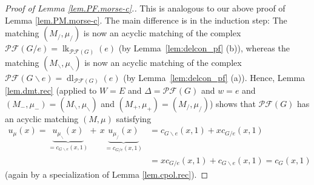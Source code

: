 \documentclass[12pt]{amsart}
\theoremstyle{definition}
\DeclareMathOperator{\lk}{lk}
\DeclareMathOperator{\dl}{dl}
\newcommand{\Pf}[1]{\mathcal{PF}\left(#1\right)}
\begin{document}
\begin{proof}
[Proof of Lemma \ref{lem.PF.morse-c}.]This is analogous to our above proof of
Lemma \ref{lem.PM.morse-c}. The main difference is in the induction step: The
matching $\left(  M_{/},\mu_{/}\right)  $ is now an acyclic matching of the
complex
$\Pf{G/e}  =\lk_{\Pf{G}}\left(  e\right)  $
(by Lemma~\ref{lem:delcon_pf}
(b)), whereas the matching $\left(  M_{\backslash},\mu_{\backslash}\right)  $
is now an acyclic matching of the complex $\Pf{G\backslash e}
=\dl_{\Pf{G}}\left(  e\right)  $
(by Lemma~\ref{lem:delcon_pf} (a)). Hence, Lemma \ref{lem.dmt.rec} (applied to
$W=E$ and $\Delta=\Pf{G}$ and $w=e$ and $\left(
M_-,\mu_-\right)  =\left(  M_{\backslash},\mu_{\backslash}\right)  $ and
$\left(  M_+,\mu_+\right)  =\left(  M_{/},\mu_{/}\right)  $) shows that
$\Pf{G}$ has an acyclic matching $\left(
M,\mu\right)  $ satisfying%
\begin{align*}
u_{\mu}\left(  x\right)
=\underbrace{u_{\mu_{\backslash}}\left(
x\right)  }_{=c_{G\backslash e}\left(  x,1\right)  }+\,x\underbrace{u_{\mu
_{/}}\left(  x\right)  }_{=c_{G/e}\left(  x,1\right)  }
&= c_{G\backslash e}\left(  x,1\right)  +xc_{G/e}\left(  x,1\right)  \\
& =xc_{G/e}\left(  x,1\right)  +c_{G\backslash e}\left(  x,1\right)
=c_{G}\left(  x,1\right)
\end{align*}
(again by a specialization of Lemma \ref{lem.cpol.rec}).
\end{proof}
\end{document}
